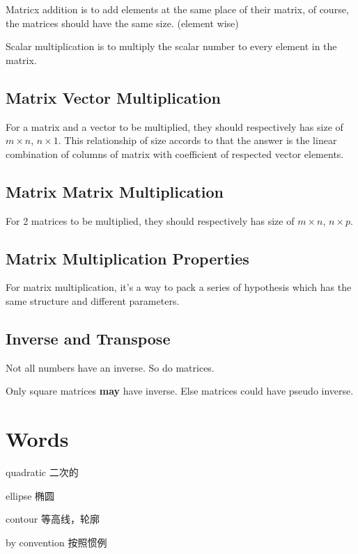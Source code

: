 \documentclass[en,11pt,english,black,simple]{../elegantbook}
\begin{document}
Matricx addition is to add elements at the same place of their matrix, of course, the matrices should have the same size. (element wise)

Scalar multiplication is to multiply the scalar number to every element in the matrix.

\subsection{Matrix Vector Multiplication}

For a matrix and a vector to be multiplied, they should respectively has size of \(m \times n\), \(n \times 1\). This relationship of size accords to that the answer is the linear combination of columns of matrix with coefficient of respected vector elements.

\subsection{Matrix Matrix Multiplication}

For 2 matrices to be multiplied, they should respectively has size of \(m \times n\), \(n \times p\).

\subsection{Matrix Multiplication Properties}

For matrix multiplication, it's a way to pack a series of hypothesis which has the same structure and different parameters. 

\subsection{Inverse and Transpose}

Not all numbers have an inverse. So do matrices. 

Only square matrices \textbf{may} have inverse. Else matrices could have pseudo inverse.

\section*{Words}

quadratic 二次的

ellipse 椭圆

contour 等高线，轮廓

by convention 按照惯例

\let\chapname\undefined
\ifx\mainclass\undefined
\end{document}
